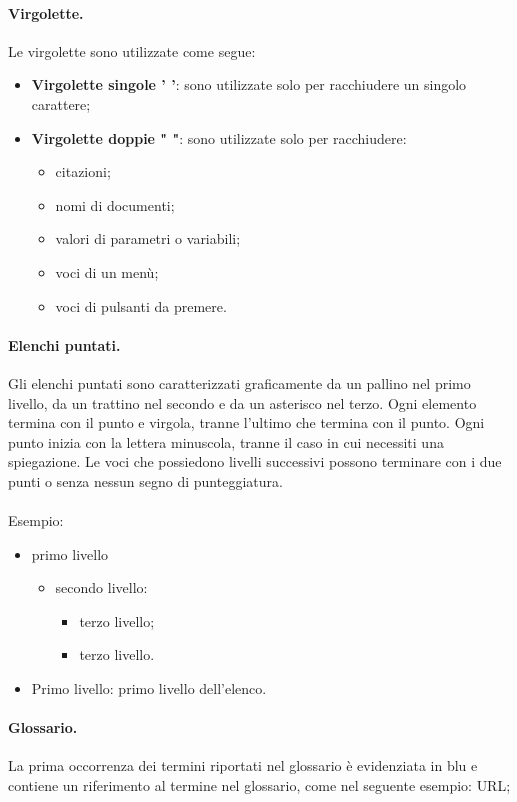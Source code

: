 \paragraph{Virgolette.}Le virgolette sono utilizzate come segue:
 \begin{itemize}
 	\item \textbf{Virgolette singole ' '}: sono utilizzate solo per racchiudere un singolo carattere;
 	\item \textbf{Virgolette doppie " "}: sono utilizzate solo per racchiudere:
 	\begin{itemize}
 		\item citazioni;
 		\item nomi di documenti;
 		\item valori di parametri o variabili;
 		\item voci di un menù;
 		\item voci di pulsanti da premere.
 	\end{itemize}
 \end{itemize}


\paragraph{Elenchi puntati.}Gli elenchi puntati sono caratterizzati graficamente da un pallino nel primo livello, da un
trattino nel secondo e da un asterisco nel terzo.
Ogni elemento termina con il punto e virgola, tranne l'ultimo che termina con il punto. Ogni punto inizia con la lettera minuscola, tranne il caso in cui necessiti una spiegazione.
Le voci che possiedono livelli successivi possono terminare con i due punti o senza nessun segno di punteggiatura.
\\
\\Esempio:
\begin{itemize}
	\item primo livello
		\begin{itemize}
			\item secondo livello:
			\begin{itemize}
				\item terzo livello;
				\item terzo livello.
			\end{itemize}
		\end{itemize}
	\item Primo livello: primo livello dell'elenco.
\end{itemize}


\paragraph{Glossario.}La prima occorrenza dei termini riportati nel glossario è evidenziata in blu e contiene un riferimento al termine nel glossario, come nel seguente esempio: \gls{URL};
